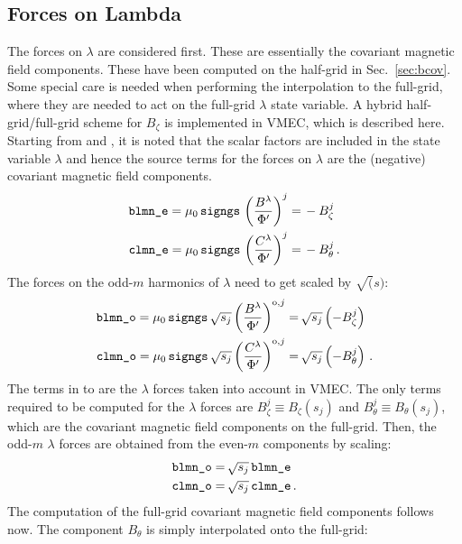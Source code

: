 \subsection{Forces on Lambda}
The forces on $\lambda$ are considered first.
These are essentially the covariant magnetic field components.
These have been computed on the half-grid in Sec.~\ref{sec:bcov}.
Some special care is needed when performing the interpolation to the full-grid,
where they are needed to act on the full-grid $\lambda$ state variable.
A hybrid half-grid/full-grid scheme for $B_\zeta$ is implemented in VMEC, which is described here.
Starting from  and , it is noted that the scalar factors are included in the state variable $\lambda$
and hence the source terms for the forces on $\lambda$ are the (negative) covariant magnetic field components.
\begin{align}
  \texttt{blmn\_e} = \mu_0 \, \texttt{signgs} \, \left(\frac{B^\lambda}{\Phi'} \right)^j =&\, - B^j_\zeta  \label{eqn:blmn_e} \\
  \texttt{clmn\_e} = \mu_0 \, \texttt{signgs} \, \left(\frac{C^\lambda}{\Phi'} \right)^j =&\, - B^j_\theta \label{eqn:clmn_e} \, .
\end{align}
The forces on the odd-$m$ harmonics of $\lambda$ need to get scaled by $\sqrt(s)$:
\begin{align}
  \texttt{blmn\_o} = \mu_0 \, \texttt{signgs} \, \sqrt{s_j} \left(\frac{B^\lambda}{\Phi'} \right)^{\mathrm{o},j} =&\, \sqrt{s_j} \left( - B^j_\zeta  \right) \label{eqn:blmn_o} \\
  \texttt{clmn\_o} = \mu_0 \, \texttt{signgs} \, \sqrt{s_j} \left(\frac{C^\lambda}{\Phi'} \right)^{\mathrm{o},j} =&\, \sqrt{s_j} \left( - B^j_\theta \right) \label{eqn:clmn_o} \, .
\end{align}
The terms in  to  are the $\lambda$ forces taken into account in VMEC.
The only terms required to be computed for the $\lambda$ forces are $B^j_\zeta \equiv B_\zeta(s_j)$ and $B^j_\theta \equiv B_\theta(s_j)$,
which are the covariant magnetic field components on the full-grid.
Then, the odd-$m$ $\lambda$ forces are obtained from the even-$m$ components by scaling:
\begin{align}
  \texttt{blmn\_o} =&\, \sqrt{s_j} \,\texttt{blmn\_e} \\
  \texttt{clmn\_o} =&\, \sqrt{s_j} \,\texttt{clmn\_e} \, .
\end{align}
The computation of the full-grid covariant magnetic field components follows now.
The component $B_\theta$ is simply interpolated onto the full-grid:
